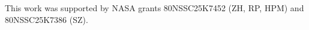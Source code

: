 \documentclass[journal abbreviation, manuscript]{copernicus}
\begin{document}


\begin{acknowledgements}
This work was supported by NASA grants 80NSSC25K7452 (ZH, RP, HPM) and 80NSSC25K7386 (SZ). 
\end{acknowledgements}












\end{document}
